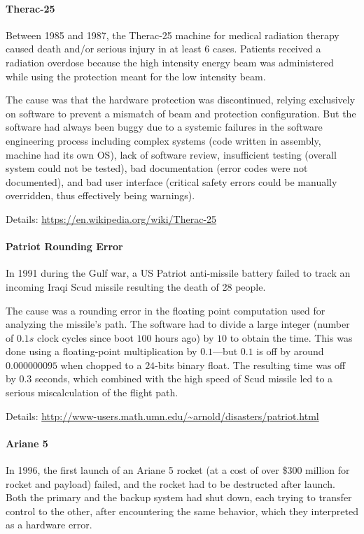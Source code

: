 \paragraph{Therac-25}
Between 1985 and 1987, the Therac-25 machine for medical radiation therapy caused death and/or serious injury in at least $6$ cases.
Patients received a radiation overdose because the high intensity energy beam was administered while using the protection meant for the low intensity beam.

The cause was that the hardware protection was discontinued, relying exclusively on software to prevent a mismatch of beam and protection configuration.
But the software had always been buggy due to a systemic failures in the software engineering process including complex systems (code written in assembly, machine had its own OS), lack of software review, insufficient testing (overall system could not be tested), bad documentation (error codes were not documented), and bad user interface (critical safety errors could be manually overridden, thus effectively being warnings).

Details: \url{https://en.wikipedia.org/wiki/Therac-25}

\paragraph{Patriot Rounding Error}
In 1991 during the Gulf war, a US Patriot anti-missile battery failed to track an incoming Iraqi Scud missile resulting the death of 28 people.

The cause was a rounding error in the floating point computation used for analyzing the missile's path.
The software had to divide a large integer (number of $0.1s$ clock cycles since boot $100$ hours ago) by $10$ to obtain the time.
This was done using a floating-point multiplication by $0.1$---but $0.1$ is off by around $0.000000095$ when chopped to a $24$-bits binary float.
The resulting time was off by $0.3$ seconds, which combined with the high speed of Scud missile led to a serious miscalculation of the flight path.

Details: \url{http://www-users.math.umn.edu/~arnold/disasters/patriot.html}

\paragraph{Ariane 5}
In 1996, the first launch of an Ariane 5 rocket (at a cost of over \$$300$ million for rocket and payload) failed, and the rocket had to be destructed after launch.
Both the primary and the backup system had shut down, each trying to transfer control to the other, after encountering the same behavior, which they interpreted as a hardware error.


